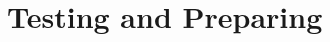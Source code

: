 \documentclass[twoside,a4paper]{refart}
\begin{document}
\section{Testing and Preparing}
%
%
%
%
%
%
%
%
%
%
%
%
%
%
%
\end{document}
